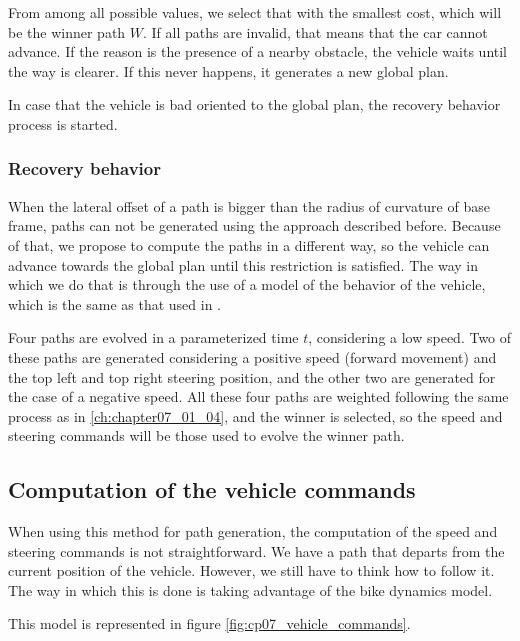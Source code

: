 From among all possible values, we select that with the smallest cost, which will be the winner path $W$. If all paths are invalid, that means that the car cannot advance. If the reason is the presence of a nearby obstacle, the vehicle waits until the way is clearer. If this never happens, it generates a new global plan.

In case that the vehicle is bad oriented to the global plan, the recovery behavior process is started.

\subsubsection{Recovery behavior}\label{ch:chapter07_01_04_02}

When the lateral offset of a path is bigger than the radius of curvature of base frame, paths can not be generated using the approach described before. Because of that, we propose to compute the paths in a different way, so the vehicle can advance towards the global plan until this restriction is satisfied. The way in which we do that is through the use of a model of the behavior of the vehicle, which is the same as that used in .

Four paths are evolved in a parameterized time $t$, considering a low speed. Two of these paths are generated considering a positive speed (forward movement) and the top left and top right steering position, and the other two are generated for the case of a negative speed. All these four paths are weighted following the same process as in \ref{ch:chapter07_01_04}, and the winner is selected, so the speed and steering commands will be those used to evolve the winner path.

\subsection{Computation of the vehicle commands}\label{ch:chapter07_01_03}

When using this method for path generation, the computation of the speed and steering commands is not straightforward. We have a path that departs from the current position of the vehicle. However, we still have to think how to follow it. The way in which this is done is taking advantage of the bike dynamics model.

This model is represented in figure \ref{fig:cp07_vehicle_commands}.

